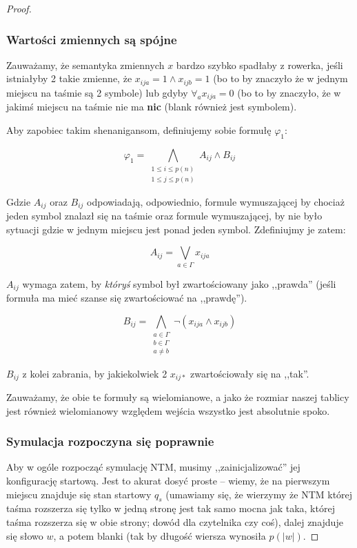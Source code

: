 \begin{proof}
    \subsubsection{Wartości zmiennych są spójne}
        Zauważamy, że semantyka zmiennych \(x\) bardzo szybko spadłaby z rowerka, jeśli istniałyby 2 takie zmienne, że \(x_{ija} = 1 \land x_{ijb} = 1\) (bo to by znaczyło że w jednym miejscu na taśmie są 2 symbole) lub gdyby \( \forall_a x_{ija} = 0\) (bo to by znaczyło, że w jakimś miejscu na taśmie nie ma \textbf{nic} (blank również jest symbolem).
    
        Aby zapobiec takim shenanigansom, definiujemy sobie formułę \(\varphi_1\): 
        
        \[ 
            \varphi_1 = \bigwedge_{\substack{1 \leq i \leq p(n) \\ 1 \leq j \leq p(n)}} A_{ij} \land B_{ij}  
        \]
        
        Gdzie \(A_{ij}\) oraz \(B_{ij}\) odpowiadają, odpowiednio, formule wymuszającej by chociaż jeden symbol znalazł się na taśmie oraz formule wymuszającej, by nie było sytuacji gdzie w jednym miejscu jest ponad jeden symbol. Zdefiniujmy je zatem:
        
        \[ 
            A_{ij} = \bigvee_{a \in \Gamma} x_{ija}
        \]
        
        \(A_{ij}\) wymaga zatem, by \textit{któryś} symbol był zwartościowany jako ,,prawda'' (jeśli formuła ma mieć szanse się zwartościować na ,,prawdę''). 
        
        \[
            B_{ij} = \bigwedge_{\substack{a\in\Gamma \\ b\in\Gamma \\ a \not = b}} \neg(x_{ija} \land x_{ijb})
        \]
    
        \(B_{ij}\) z kolei zabrania, by jakiekolwiek 2 \(x_{ij*}\) zwartościowały się na ,,tak''. 
        
        Zauważamy, że obie te formuły są wielomianowe, a jako że rozmiar naszej tablicy jest również wielomianowy względem wejścia wszystko jest absolutnie spoko. 
    
    \subsubsection{Symulacja rozpoczyna się poprawnie}
        Aby w ogóle rozpocząć symulację NTM, musimy ,,zainicjalizować'' jej konfigurację startową. Jest to akurat dosyć proste -- wiemy, że na pierwszym miejscu znajduje się stan startowy \(q_s\) (umawiamy się, że wierzymy że NTM której taśma rozszerza się tylko w jedną stronę jest tak samo mocna jak taka, której taśma rozszerza się w obie strony; dowód dla czytelnika czy coś), dalej znajduje się słowo \(w\), a potem blanki (tak by długość wiersza wynosiła \(p(|w|)\). 
        

\end{proof}
